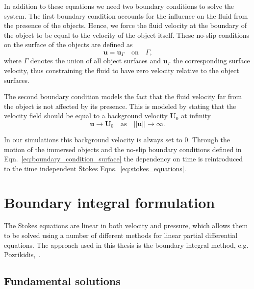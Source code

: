 In addition to these equations we need two boundary conditions to solve the system. The first boundary condition accounts for the influence on the fluid from the presence of the objects. Hence, we force the fluid velocity at the boundary of the object to be equal to the velocity of the object itself. These no-slip conditions on the surface of the objects are defined as
\begin{equation}
  \label{eq:boundary_condition_surface}
  \mathbf{u} = \mathbf{u}_\Gamma  \quad \text{on} \quad  \Gamma \text{,}
\end{equation}
where $\Gamma$ denotes the union of all object surfaces and $\mathbf{u}_\Gamma$ the corresponding surface velocity, thus constraining the fluid to have zero velocity relative to the object surfaces.

The second boundary condition models the fact that the fluid velocity far from the object is not affected by its presence. This is modeled by stating that the velocity field should be equal to a background velocity $\mathbf{U}_0$ at infinity
\begin{equation}
  \label{eq:boundary_condition_background}
  \mathbf{u} \rightarrow \mathbf{U}_0 \quad \text{as} \quad ||\mathbf{u}|| \rightarrow \infty \text{.}
\end{equation}

In our simulations this background velocity is always set to $0$. Through the motion of the immersed objects and the no-slip boundary conditions defined in Eqn.~\eqref{eq:boundary_condition_surface} the dependency on time is reintroduced to the time independent Stokes Eqns.~\eqref{eq:stokes_equations}.

\section{Boundary integral formulation}
\label{sec:boundary_integral_formulation}

The Stokes equations are linear in both velocity and pressure, which allows them to be solved using a number of different methods for linear partial differential equations. The approach used in this thesis is the boundary integral method, e.g. Pozrikidis,~\cite{Pozrikidis1992}.

\subsection{Fundamental solutions}
\label{subsec:fundamental_solutions}

